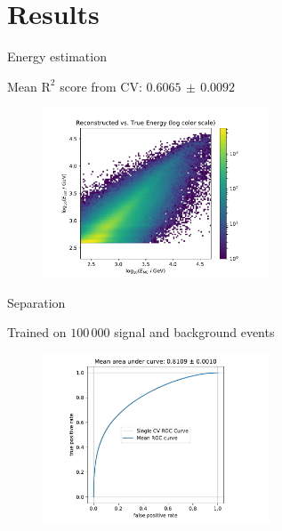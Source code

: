 \section{Results}
\begin{frame}[t]{Energy estimation}

Mean $\text{R}^2$ score from CV: $0.6065\,\pm\,0.0092$

\begin{figure}
    \centering
    \includegraphics[width=0.6\textwidth,page=1]{fig/energy-performance.pdf}
\end{figure}
\end{frame}

\begin{frame}[t]{Separation}

Trained on $100\,000$ signal and background events 
\begin{figure}
    \centering
    \includegraphics[width=0.6\textwidth,page=1]{fig/separation_performance.pdf}
\end{figure}
\end{frame}

